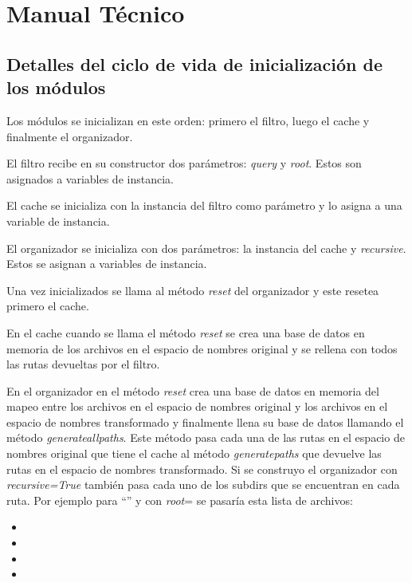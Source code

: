 \chapter{Manual Técnico}

\section{Detalles del ciclo de vida de inicialización de los módulos}
\label{detallesciclodevida}

Los módulos se inicializan en este orden: primero el filtro, luego el cache y finalmente el organizador.

El filtro recibe en su constructor dos parámetros: \textit{query} y \textit{root}. Estos son asignados a variables de instancia.

El cache se inicializa con la instancia del filtro como parámetro y lo asigna a una variable de instancia.

El organizador se inicializa con dos parámetros: la instancia del cache y \textit{recursive}. Estos se asignan a variables de instancia.

Una vez inicializados se llama al método \textit{reset} del organizador y este resetea primero el cache.

En el cache cuando se llama el método \textit{reset} se crea una base de datos en memoria de los archivos en el espacio de nombres original y se rellena con todos las rutas devueltas por el filtro.

En el organizador en el método \textit{reset} crea una base de datos en memoria del mapeo entre los archivos en el espacio de nombres original y los archivos en el espacio de nombres transformado y finalmente llena su base de datos llamando el método \textit{generateallpaths}. Este método pasa cada una de las rutas en el espacio de nombres original que tiene el cache al método \textit{generatepaths} que devuelve las rutas en el espacio de nombres transformado. Si se construyo el organizador con \textit{recursive=True} también pasa cada uno de los subdirs que se encuentran en cada ruta. Por ejemplo para ``'' y con \textit{root}= se pasaría esta lista de archivos:

\begin{itemize}
\item {}
\item {}
\item {}
\item {}
\end{itemize}

